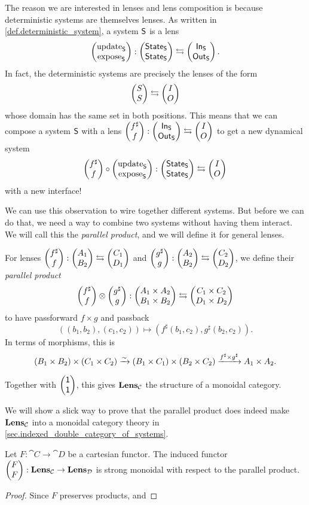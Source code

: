 \documentclass[DynamicalBook]{subfiles}
\begin{document}
The reason we are interested in lenses and lens composition is because
deterministic systems are themselves lenses. As written in
\cref{def.deterministic_system}, a system $\mathsf{S}$ is a lens
$$\begin{pmatrix}{\mathrm{update}_{\mathsf{S}}} \\ {\mathrm{expose}_{\mathsf{S}}} \end{pmatrix} : \begin{pmatrix}{\mathsf{State}_{\mathsf{S}}} \\ {\mathsf{State}_{\mathsf{S}}} \end{pmatrix} \leftrightarrows \begin{pmatrix}{\mathsf{In}_{\mathsf{S}}} \\ {\mathsf{Out}_{\mathsf{S}}} \end{pmatrix}.$$
In fact, the deterministic systems are precisely the lenses of the form
$$\begin{pmatrix}{S} \\ {S} \end{pmatrix} \leftrightarrows \begin{pmatrix}{I} \\ {O} \end{pmatrix}$$
whose domain has the same set in both positions. This means that we can compose
a system $\mathsf{S}$ with a lens $\begin{pmatrix}{f^{\sharp}} \\ {f} \end{pmatrix} : \begin{pmatrix}{\mathsf{In}_{\mathsf{S}}} \\ {\mathsf{Out}_{\mathsf{S}}} \end{pmatrix}
\leftrightarrows \begin{pmatrix}{I} \\ {O} \end{pmatrix}$ to get a new dynamical system
$$\begin{pmatrix}{f^{\sharp}} \\ {f} \end{pmatrix} \circ \begin{pmatrix}{\mathrm{update}_{\mathsf{S}}} \\ {\mathrm{expose}_{\mathsf{S}}} \end{pmatrix} :
\begin{pmatrix}{\mathsf{State}_{\mathsf{S}}} \\ {\mathsf{State}_{\mathsf{S}}} \end{pmatrix} \leftrightarrows \begin{pmatrix}{I} \\ {O} \end{pmatrix}$$
with a new interface!

We can use this observation to wire together different systems. But before we
can do that, we need a way to combine two systems without having them interact.
We will call this the \emph{parallel product}, and we will define it for general
lenses.

\begin{definition}
  For lenses $\begin{pmatrix}{f^{\sharp}} \\ {f} \end{pmatrix} : \begin{pmatrix}{A_1} \\ {B_2} \end{pmatrix} \leftrightarrows \begin{pmatrix}{C_1} \\ {D_1} \end{pmatrix}$ and
  $\begin{pmatrix}{g^{\sharp}} \\ {g} \end{pmatrix} : \begin{pmatrix}{A_2} \\ {B_2} \end{pmatrix} \leftrightarrows \begin{pmatrix}{C_2} \\ {D_2} \end{pmatrix}$, we
  define their \emph{parallel product} $$\begin{pmatrix}{f^{\sharp}} \\ {f} \end{pmatrix} \otimes
  \begin{pmatrix}{g^{\sharp}} \\ {g} \end{pmatrix} : \begin{pmatrix}{A_1 \times A_2} \\ {B_1 \times B_2} \end{pmatrix} \leftrightarrows
  \begin{pmatrix}{C_1 \times C_2} \\ {D_1 \times D_2} \end{pmatrix}$$
  to have passforward $f \times g$ and passback
  $$((b_1, b_2), (c_1, c_2)) \mapsto (f^{\sharp}(b_1, c_2), g^{\sharp}(b_2, c_2)).$$
  In terms of morphisms, this is
  $$(B_1 \times B_2) \times (C_1 \times C_2) \xrightarrow{\sim} (B_1 \times C_1) \times
  (B_2 \times C_2) \xrightarrow{f^{\sharp} \times g^{\sharp}} A_1 \times A_2.$$

  Together with $\begin{pmatrix}{\mathsf{1}} \\ {\mathsf{1}} \end{pmatrix}$, this gives $\textbf{Lens}_{\mathcal{C}}$ the
  structure of a monoidal category.
\end{definition}

\begin{remark}
  We will show a slick way to prove that the parallel product does indeed make
  $\textbf{Lens}_{\mathcal{C}}$ into a monoidal category theory in \cref{sec.indexed_double_category_of_systems}.
\end{remark}


\begin{proposition}\label{prop.lens_functoriality_monoidal}
Let $F : \cat{C} \to \cat{D}$ be a cartesian functor. The induced functor
$\begin{pmatrix}{F} \\ {F} \end{pmatrix} : \textbf{Lens}_{\mathcal{C}} \to \textbf{Lens}_{\mathcal{D}}$ is strong monoidal
with respect to the parallel product.
\end{proposition}
\begin{proof}
  Since $F$ preserves products, and 
\end{proof}
\end{document}
